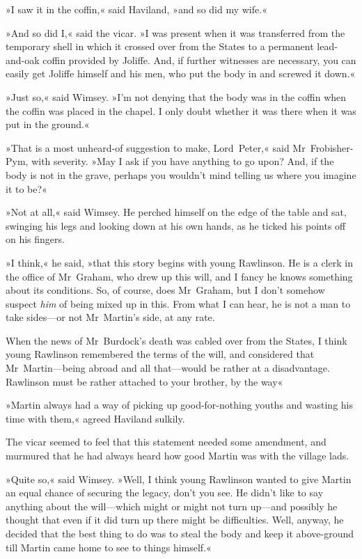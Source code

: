 »I saw it in the coffin,« said Haviland, »and so did my wife.«

»And so did I,« said the vicar. »I was present when it was transferred from the temporary shell in which it crossed over from the States to a permanent lead-and-oak coffin provided by Joliffe. And, if further witnesses are necessary, you can easily get Joliffe himself and his men, who put the body in and screwed it down.«

»Just so,« said Wimsey. »I'm not denying that the body was in the coffin when the coffin was placed in the chapel. I only doubt whether it was there when it was put in the ground.«

»That is a most unheard-of suggestion to make, Lord~Peter,« said Mr~Frobisher-Pym, with severity. »May I ask if you have anything to go upon? And, if the body is not in the grave, perhaps you wouldn't mind telling us where you imagine it to be?«

»Not at all,« said Wimsey. He perched himself on the edge of the table and sat, swinging his legs and looking down at his own hands, as he ticked his points off on his fingers.

»I think,« he said, »that this story begins with young Rawlinson. He is a clerk in the office of Mr~Graham, who drew up this will, and I fancy he knows something about its conditions. So, of course, does Mr~Graham, but I don't somehow suspect \textit{him} of being mixed up in this. From what I can hear, he is not a man to take sides—or not Mr~Martin's side, at any rate.

When the news of Mr~Burdock's death was cabled over from the States, I think young Rawlinson remembered the terms of the will, and considered that Mr~Martin—being abroad and all that—would be rather at a disadvantage. Rawlinson must be rather attached to your brother, by the way\longdash«

»Martin always had a way of picking up good-for-nothing youths and wasting his time with them,« agreed Haviland sulkily.

The vicar seemed to feel that this statement needed some amendment, and murmured that he had always heard how good Martin was with the village lads.

»Quite so,« said Wimsey. »Well, I think young Rawlinson wanted to give Martin an equal chance of securing the legacy, don't you see. He didn't like to say anything about the will—which might or might not turn up—and possibly he thought that even if it did turn up there might be difficulties. Well, anyway, he decided that the best thing to do was to steal the body and keep it above-ground till Martin came home to see to things himself.«

